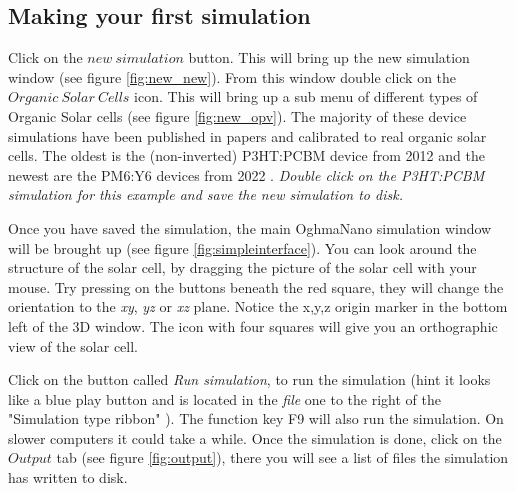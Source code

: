 \subsection{Making your first simulation}

Click on the $new~simulation$ button.  This will bring up the new simulation window (see figure \ref{fig:new_new}). From this window double click on the $Organic~Solar~Cells$ icon. This will bring up a sub menu of different types of Organic Solar cells (see figure \ref{fig:new_opv}). The majority of these device simulations have been published in papers and calibrated to real organic solar cells. The oldest is the (non-inverted) P3HT:PCBM device from 2012 \cite{mackenzie2012extracting} and the newest are the PM6:Y6 devices from 2022 \cite{zhu2022single,wopke2022traps}. \emph{Double click on the P3HT:PCBM simulation for this example and save the new simulation to disk.}

Once you have saved the simulation, the main OghmaNano simulation window will be brought up (see figure \ref{fig:simpleinterface}). You can look around the structure of the solar cell, by dragging the picture of the solar cell with your mouse.  Try pressing on the buttons beneath the red square, they will change the orientation to the \emph{xy}, \emph{yz} or \emph{xz} plane. Notice the x,y,z origin marker in the bottom left of the 3D window. The icon with four squares will give you an orthographic view of the solar cell.


Click on the button called \emph{Run simulation}, to run the simulation (hint it looks like a blue play button and is located in the \emph{file} one to the right of the "Simulation type ribbon" ).  The function key F9 will also run the simulation. On slower computers it could take a while. Once the simulation is done, click on the $Output$ tab (see figure \ref{fig:output}), there you will see a list of files the simulation has written to disk.

